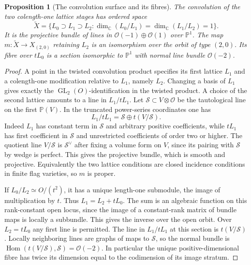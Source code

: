 \documentclass[11pt,oneside,openany]{book}
\newtheorem{proposition}[theorem]{Proposition}
\theoremstyle{definition}
\theoremstyle{remark}
\begin{document}
\begin{proposition}[The convolution surface and its fibres]
\label{res:GS08}
The convolution of the two colength-one lattice stages has
ordered space
\[
 \widetilde X=\{L_0\supset L_1\supset L_2:
       \dim_{\mathbb C}(L_0/L_1)=\dim_{\mathbb C}(L_1/L_2)=1\}.
\]
It is the projective bundle of lines in
\(\mathcal O(-1)\oplus\mathcal O(1)\) over \(\mathbb P^1\).
The map \(m:\widetilde X\to X_{(2,0)}\) retaining \(L_2\)
is an isomorphism over the orbit of type \((2,0)\).
Its fibre over \(tL_0\) is a section isomorphic to
\(\mathbb P^1\) with normal line bundle \(\mathcal O(-2)\).
\end{proposition}

\begin{proof}
A point in the twisted convolution product specifies its
first lattice \(L_1\) and a colength-one modification
relative to \(L_1\), namely \(L_2\).
Changing a basis of \(L_1\) gives exactly the
\(\operatorname{GL}_2(O)\)-identification in the twisted
product. A choice of the second lattice amounts to a line
in \(L_1/tL_1\).
Let \(\mathcal S\subset V\otimes\mathcal O\) be the
tautological line on the first \(\mathbb P(V)\).
In the truncated power-series coordinates one has
\[
 L_1/tL_1=\mathcal S\oplus t(V/\mathcal S).
\]
Indeed \(L_1\) has constant term in \(\mathcal S\) and
arbitrary positive coefficients, while \(tL_1\) has
first coefficient in \(\mathcal S\) and unrestricted
coefficients of order two or higher. The quotient line
\(V/\mathcal S\) is \(\mathcal S^\vee\) after fixing a
volume form on \(V\), since its pairing with \(\mathcal S\)
by wedge is perfect. This gives the projective bundle,
which is smooth and projective. Equivalently the two
lattice conditions are closed incidence conditions in
finite flag varieties, so \(m\) is proper.

If \(L_0/L_2\simeq O/(t^2)\), it has a unique length-one
submodule, the image of multiplication by \(t\).
Thus \(L_1=L_2+tL_0\). The sum is an algebraic function
on this rank-constant open locus, since the image of a
constant-rank matrix of bundle maps is locally a
subbundle. This gives the inverse over the open orbit.
Over \(L_2=tL_0\) any first line is permitted. The line
in \(L_1/tL_1\) at this section is \(t(V/\mathcal S)\).
Locally neighboring lines are graphs of maps to \(\mathcal S\),
so the normal bundle is
\(\operatorname{Hom}(t(V/\mathcal S),\mathcal S)=\mathcal O(-2)\).
In particular the unique
positive-dimensional fibre has twice its dimension equal
to the codimension of its image stratum.
\end{proof}
\end{document}
